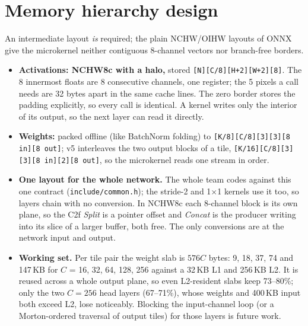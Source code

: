 \documentclass[10pt]{article}
\newcommand{\code}[1]{\texttt{#1}}
\begin{document}
\section{Memory hierarchy design}\label{sec:mem}
An intermediate layout \emph{is} required; the plain NCHW/OIHW layouts of ONNX give the microkernel neither contiguous 8-channel vectors nor branch-free borders.
\begin{itemize}
\item \textbf{Activations: NCHW8c with a halo,} stored \code{[N][C/8][H+2][W+2][8]}. The 8 innermost floats are 8 consecutive channels, one register; the 5 pixels a call needs are 32 bytes apart in the same cache lines. The zero border stores the padding explicitly, so every call is identical. A kernel writes only the interior of its output, so the next layer can read it directly.
\item \textbf{Weights:} packed offline (like BatchNorm folding) to \code{[K/8][C/8][3][3][8 in][8 out]}; v5 interleaves the two output blocks of a tile, \code{[K/16][C/8][3][3][8 in][2][8 out]}, so the microkernel reads one stream in order.
\item \textbf{One layout for the whole network.} The whole team codes against this one contract (\code{include/common.h}); the stride-2 and 1$\times$1 kernels use it too, so layers chain with no conversion. In NCHW8c each 8-channel block is its own plane, so the C2f \emph{Split} is a pointer offset and \emph{Concat} is the producer writing into its slice of a larger buffer, both free. The only conversions are at the network input and output.
\item \textbf{Working set.} Per tile pair the weight slab is $576C$ bytes: 9, 18, 37, 74 and 147\,KB for $C$ = 16, 32, 64, 128, 256 against a 32\,KB L1 and 256\,KB L2. It is reused across a whole output plane, so even L2-resident slabs keep 73--80\%; only the two $C=256$ head layers (67--71\%), whose weights and 400\,KB input both exceed L2, lose noticeably. Blocking the input-channel loop (or a Morton-ordered traversal of output tiles) for those layers is future work.
\end{itemize}
\end{document}
